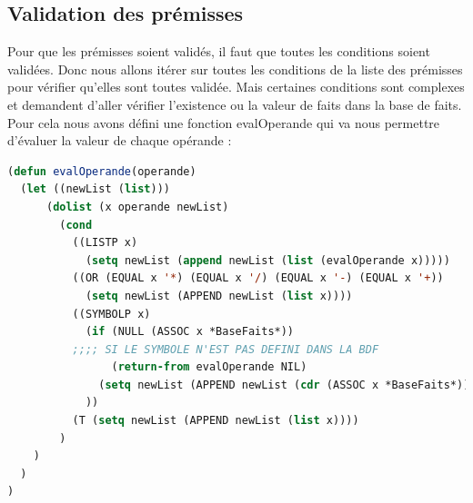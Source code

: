 \documentclass[a4paper,10pt]{report}
\begin{document}
    \subsection{Validation des prémisses}
    Pour que les prémisses soient validés, il faut que toutes les conditions soient validées. Donc nous allons itérer sur toutes les conditions de la liste
    des prémisses pour vérifier qu'elles sont toutes validée. Mais certaines conditions sont complexes et demandent d'aller vérifier l'existence ou la valeur
    de faits dans la base de faits. Pour cela nous avons défini une fonction evalOperande qui va nous permettre d'évaluer la valeur de chaque opérande :
    \begin{lstlisting}[language=Lisp]
(defun evalOperande(operande)
  (let ((newList (list)))
      (dolist (x operande newList)
        (cond
          ((LISTP x)
            (setq newList (append newList (list (evalOperande x)))))
          ((OR (EQUAL x '*) (EQUAL x '/) (EQUAL x '-) (EQUAL x '+))
            (setq newList (APPEND newList (list x))))
          ((SYMBOLP x)
            (if (NULL (ASSOC x *BaseFaits*))
	      ;;;; SI LE SYMBOLE N'EST PAS DEFINI DANS LA BDF
                (return-from evalOperande NIL) 
              (setq newList (APPEND newList (cdr (ASSOC x *BaseFaits*))))
            ))
          (T (setq newList (APPEND newList (list x))))
        )
    )
  )
)    
    \end{lstlisting}
\end{document}
